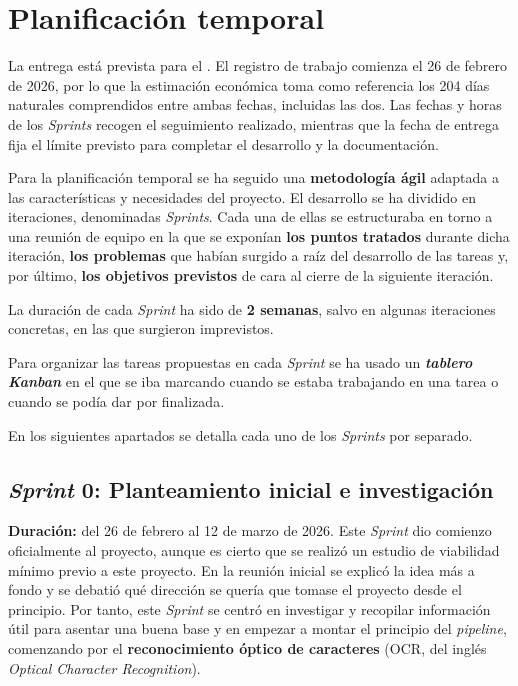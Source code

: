 \section{Planificación temporal}
La entrega está prevista para el \fechaEntrega. El registro de trabajo
comienza el 26 de febrero de 2026, por lo que la estimación económica toma
como referencia los \num{204} días naturales comprendidos entre ambas
fechas, incluidas las dos. Las fechas y horas de los \textit{Sprints}
recogen el seguimiento realizado, mientras que la fecha de entrega fija el
límite previsto para completar el desarrollo y la documentación.

Para la planificación temporal se ha seguido una \textbf{metodología ágil}
adaptada a las características y necesidades del proyecto. El desarrollo
se ha dividido en iteraciones, denominadas \textit{Sprints}. Cada una de
ellas se estructuraba en torno a una reunión de equipo en la que se exponían
\textbf{los puntos tratados} durante dicha iteración, \textbf{los problemas}
que habían surgido a raíz del desarrollo de las tareas y, por último,
\textbf{los objetivos previstos} de cara al cierre de la siguiente iteración.

La duración de cada \textit{Sprint} ha sido de \textbf{2 semanas}, salvo en
algunas iteraciones concretas, en las que surgieron imprevistos.

Para organizar las tareas propuestas en cada \textit{Sprint} se ha usado un
\textbf{\textit{tablero Kanban}} en el que se iba marcando cuando se estaba
trabajando en una tarea o cuando se podía dar por finalizada.

En los siguientes apartados se detalla cada uno de los \textit{Sprints} por
separado.

\subsection{\textit{Sprint} 0: Planteamiento inicial e investigación}
\textbf{Duración:} del 26 de febrero al 12 de marzo de 2026.
Este \textit{Sprint} dio comienzo oficialmente al proyecto, aunque es cierto
que se realizó un estudio de viabilidad mínimo previo a este proyecto. En la
reunión inicial se explicó la idea más a fondo y se debatió qué dirección se
quería que tomase el proyecto desde el principio. Por tanto, este \textit{Sprint}
se centró en investigar y recopilar información útil para asentar una buena base
y en empezar a montar el principio del \textit{pipeline}, comenzando por el
\textbf{reconocimiento óptico de caracteres} (\acs{OCR}, del inglés \textit{Optical Character
Recognition}).

